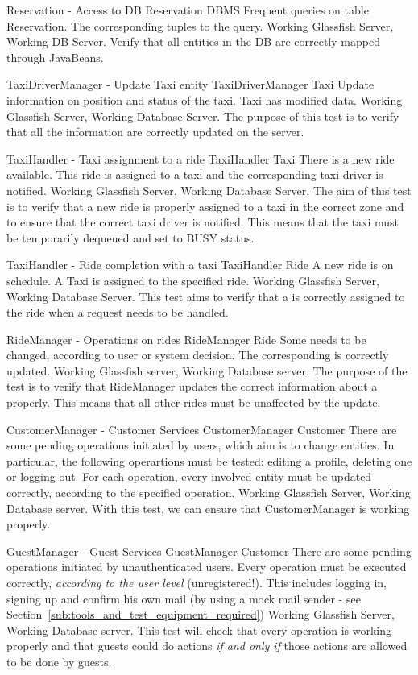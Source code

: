 \testx
{Reservation - Access to DB}
{Reservation}
{DBMS}
{Frequent queries on table Reservation.}
{The corresponding tuples to the query.}
{Working Glassfish Server, Working DB Server.}
{Verify that all entities in the DB are correctly mapped through JavaBeans.}

\testx
{TaxiDriverManager - Update Taxi entity}
{TaxiDriverManager}
{Taxi}
{Update information on position and status of the taxi.}
{Taxi has modified data.}
{Working Glassfish Server, Working Database Server.}
{The purpose of this test is to verify that all the information are correctly
updated on the server.}

\testx
{TaxiHandler - Taxi assignment to a ride}
{TaxiHandler}
{Taxi}
{There is a new ride available.}
{This ride is assigned to a taxi and the corresponding taxi driver is notified.}
{Working Glassfish Server, Working Database Server.}
{The aim of this test is to verify that a new ride is properly assigned to
a taxi in the correct zone and to ensure that the correct taxi driver is notified. This means that the taxi must be temporarily dequeued and set to BUSY status.}

\testx
{TaxiHandler - Ride completion with a taxi}
{TaxiHandler}
{Ride}
{A new ride is on schedule.}
{A Taxi is assigned to the specified ride.}
{Working Glassfish Server, Working Database Server.}
{This test aims to verify that a  is correctly assigned to the ride
when a request needs to be handled.}

\testx
{RideManager - Operations on rides}
{RideManager}
{Ride}
{Some  needs to be changed, according to user or system decision.}
{The corresponding  is correctly updated.}
{Working Glassfish server, Working Database server.}
{The purpose of the test is to verify that RideManager updates the correct
information about a  properly. This means that all other rides must be unaffected by the update.}

\testx
{CustomerManager - Customer Services}
{CustomerManager}
{Customer}
{There are some pending operations initiated by users, which aim is to change
 entities. In particular, the following operartions must be tested: editing a profile, deleting one or logging out.}
{For each operation, every involved  entity must be updated correctly,
according to the specified operation.}
{Working Glassfish Server, Working Database server.}
{With this test, we can ensure that CustomerManager is working properly.}

\testx
{GuestManager - Guest Services}
{GuestManager}
{Customer}
{There are some pending operations initiated by unauthenticated users.}
{Every operation must be executed correctly, \emph{according to the user level}
(unregistered!). This includes logging in, signing up and confirm his own mail (by using a mock mail sender - see Section~\ref{sub:tools_and_test_equipment_required})}
{Working Glassfish Server, Working Database server.}
{This test will check that every  operation is working properly
and that guests could do actions \emph{if and only if} those actions are allowed to be done by guests.}

